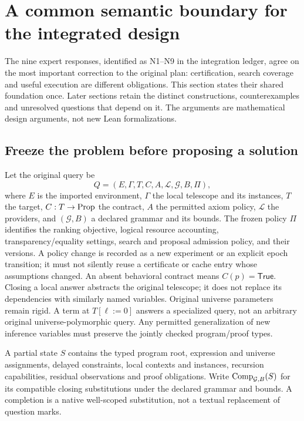 \section{A common semantic boundary for the integrated design}
\label{sec:semantic-boundaries}

The nine expert responses, identified as N1--N9 in the integration ledger,
agree on the most important correction to the original plan: certification,
search coverage and useful execution are different obligations. This section
states their shared foundation once. Later sections retain the distinct
constructions, counterexamples and unresolved questions that depend on it.
The arguments are mathematical design arguments, not new Lean formalizations.

\subsection{Freeze the problem before proposing a solution}

Let the original query be
\[
 Q=(E,\Gamma,T,C,A,\mathcal L,\mathcal G,B,\Pi),
\]
where $E$ is the imported environment, $\Gamma$ the local telescope and its
instances, $T$ the target, $C:T\to\mathrm{Prop}$ the contract, $A$ the permitted axiom
policy, $\mathcal L$ the providers, and $(\mathcal G,B)$ a declared grammar
and its bounds. The frozen policy $\Pi$ identifies the ranking objective,
logical resource accounting, transparency/equality settings, search and
proposal admission policy, and their versions. A policy change is recorded
as a new experiment or an explicit epoch transition; it must not silently
reuse a certificate or cache entry whose assumptions changed.
An absent behavioral contract means $C(p)=\mathsf{True}$.
Closing a local answer abstracts the original telescope; it does not replace
its dependencies with similarly named variables. Original universe parameters
remain rigid. A term at $T[\ell:=0]$ answers a specialized query, not an
arbitrary original universe-polymorphic query. Any permitted generalization of
new inference variables must preserve the jointly checked program/proof types.

\begin{definition}\label{def:completion-set}
A partial state $S$ contains the typed program root, expression and universe
assignments, delayed constraints, local contexts and instances, recursion
capabilities, residual observations and proof obligations. Write
$\mathrm{Comp}_{\mathcal G,B}(S)$ for its compatible closing substitutions under the
declared grammar and bounds. A completion is a native well-scoped substitution,
not a textual replacement of question marks.
\end{definition}

